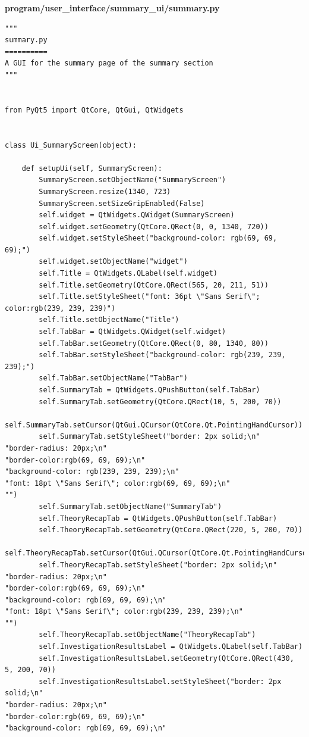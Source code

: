 \documentclass{article}
\begin{document}
\textbf{program/user\_interface/summary\_ui/summary.py}

\begin{lstlisting}
"""
summary.py
==========
A GUI for the summary page of the summary section
"""


from PyQt5 import QtCore, QtGui, QtWidgets


class Ui_SummaryScreen(object):

    def setupUi(self, SummaryScreen):
        SummaryScreen.setObjectName("SummaryScreen")
        SummaryScreen.resize(1340, 723)
        SummaryScreen.setSizeGripEnabled(False)
        self.widget = QtWidgets.QWidget(SummaryScreen)
        self.widget.setGeometry(QtCore.QRect(0, 0, 1340, 720))
        self.widget.setStyleSheet("background-color: rgb(69, 69, 69);")
        self.widget.setObjectName("widget")
        self.Title = QtWidgets.QLabel(self.widget)
        self.Title.setGeometry(QtCore.QRect(565, 20, 211, 51))
        self.Title.setStyleSheet("font: 36pt \"Sans Serif\"; color:rgb(239, 239, 239)")
        self.Title.setObjectName("Title")
        self.TabBar = QtWidgets.QWidget(self.widget)
        self.TabBar.setGeometry(QtCore.QRect(0, 80, 1340, 80))
        self.TabBar.setStyleSheet("background-color: rgb(239, 239, 239);")
        self.TabBar.setObjectName("TabBar")
        self.SummaryTab = QtWidgets.QPushButton(self.TabBar)
        self.SummaryTab.setGeometry(QtCore.QRect(10, 5, 200, 70))
        self.SummaryTab.setCursor(QtGui.QCursor(QtCore.Qt.PointingHandCursor))
        self.SummaryTab.setStyleSheet("border: 2px solid;\n"
"border-radius: 20px;\n"
"border-color:rgb(69, 69, 69);\n"
"background-color: rgb(239, 239, 239);\n"
"font: 18pt \"Sans Serif\"; color:rgb(69, 69, 69);\n"
"")
        self.SummaryTab.setObjectName("SummaryTab")
        self.TheoryRecapTab = QtWidgets.QPushButton(self.TabBar)
        self.TheoryRecapTab.setGeometry(QtCore.QRect(220, 5, 200, 70))
        self.TheoryRecapTab.setCursor(QtGui.QCursor(QtCore.Qt.PointingHandCursor))
        self.TheoryRecapTab.setStyleSheet("border: 2px solid;\n"
"border-radius: 20px;\n"
"border-color:rgb(69, 69, 69);\n"
"background-color: rgb(69, 69, 69);\n"
"font: 18pt \"Sans Serif\"; color:rgb(239, 239, 239);\n"
"")
        self.TheoryRecapTab.setObjectName("TheoryRecapTab")
        self.InvestigationResultsLabel = QtWidgets.QLabel(self.TabBar)
        self.InvestigationResultsLabel.setGeometry(QtCore.QRect(430, 5, 200, 70))
        self.InvestigationResultsLabel.setStyleSheet("border: 2px solid;\n"
"border-radius: 20px;\n"
"border-color:rgb(69, 69, 69);\n"
"background-color: rgb(69, 69, 69);\n"

\end{lstlisting}
\end{document}
